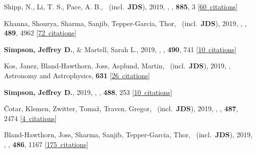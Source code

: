 \item[{\color{numcolor}\scriptsize33}] Shipp, N., Li, T. S., Pace, A. B., \etal\ (incl.\ \textbf{JDS}), 2019, , \apj, \textbf{885}, 3 [\href{https://ui.adsabs.harvard.edu/#abs/2019ApJ...885....3S}{60~citations}]

\item[{\color{numcolor}\scriptsize32}] Khanna, Shourya, Sharma, Sanjib, Tepper-Garcia, Thor, \etal\ (incl.\ \textbf{JDS}), 2019, , \mnras, \textbf{489}, 4962 [\href{https://ui.adsabs.harvard.edu/#abs/2019MNRAS.489.4962K}{72~citations}]

\item[{\color{numcolor}\scriptsize31}] \textbf{Simpson, Jeffrey D.}, \& Martell, Sarah L., 2019, , \mnras, \textbf{490}, 741 [\href{https://ui.adsabs.harvard.edu/#abs/2019MNRAS.490..741S}{10~citations}]

\item[{\color{numcolor}\scriptsize30}] Kos, Janez, Bland-Hawthorn, Joss, Asplund, Martin, \etal\ (incl.\ \textbf{JDS}), 2019, , Astronomy and Astrophysics, \textbf{631} [\href{https://ui.adsabs.harvard.edu/#abs/2019A&A...631A.166K}{26~citations}]

\item[{\color{numcolor}\scriptsize29}] \textbf{Simpson, Jeffrey D.}, 2019, , \mnras, \textbf{488}, 253 [\href{https://ui.adsabs.harvard.edu/#abs/2019MNRAS.488..253S}{10~citations}]

\item[{\color{numcolor}\scriptsize28}] {\v{C}}otar, Klemen, Zwitter, Toma{\v{z}}, Traven, Gregor, \etal\ (incl.\ \textbf{JDS}), 2019, , \mnras, \textbf{487}, 2474 [\href{https://ui.adsabs.harvard.edu/#abs/2019MNRAS.487.2474C}{4~citations}]

\item[{\color{numcolor}\scriptsize27}] Bland-Hawthorn, Joss, Sharma, Sanjib, Tepper-Garcia, Thor, \etal\ (incl.\ \textbf{JDS}), 2019, , \mnras, \textbf{486}, 1167 [\href{https://ui.adsabs.harvard.edu/#abs/2019MNRAS.486.1167B}{175~citations}]

